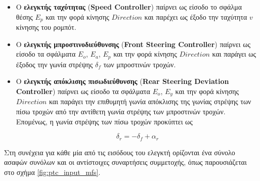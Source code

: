 \begin{itemize}
	\item Ο \textbf{ελεγκτής ταχύτητας} (\textbf{Speed Controller}) παίρνει ως είσοδο το σφάλμα θέσης $E_p$ και την φορά κίνησης $Direction$ και παρέχει ως έξοδο την ταχύτητα $v$ κίνησης του ρομπότ.

	\item Ο \textbf{ελεγκτής μπροστινοδιεύθυνσης} (\textbf{Front Steering Controller}) παίρνει ως είσοδο τα σφάλματα $E_o$, $E_a$, $E_p$ και την φορά κίνησης $Direction$ και παράγει ως έξοδος την γωνία στρέψης $\delta_f$ των μπροστινών τροχών.
	
	\item Ο \textbf{ελεγκτής απόκλισης πισωδιεύθυνσης} (\textbf{Rear Steering Deviation Controller}) παίρνει ως είσοδο τα σφάλματα $E_o$, $E_y$ και την φορά κίνησης $Direction$ και παράγει την επιθυμητή γωνία απόκλισης της γωνίας στρέψης των πίσω τροχών από την αντίθετη γωνία στρέψης των μπροστινών τροχών. Επομένως, η γωνία στρέψης των πίσω τροχών προκύπτει ως 
	
\begin{equation}
	\delta_r = - \delta_f + \alpha_r	
\end{equation}

\end{itemize}


\bigskip
Στη συνέχεια για κάθε μία από τις εισόδους του ελεγκτή ορίζονται ένα σύνολο ασαφών συνόλων και οι αντίστοιχες συναρτήσεις συμμετοχής, όπως παρουσιάζεται στο σχήμα \ref{fig:ptc_input_mfs}.

